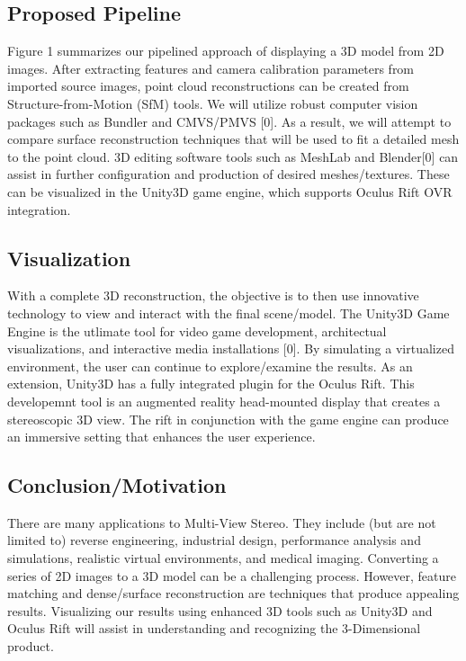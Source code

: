 \documentclass[10pt,twocolumn,letterpaper]{article}
\begin{document}
\subsection{Proposed Pipeline}
Figure 1 summarizes our pipelined approach of displaying a 3D model from 2D images.  After extracting features and camera calibration parameters from imported source images, point cloud reconstructions can be created from Structure-from-Motion (SfM) tools.  We will utilize robust computer vision packages such as Bundler and CMVS/PMVS [0].  As a result, we will attempt to compare surface reconstruction techniques that will be used to fit a detailed mesh to the point cloud.  3D editing software tools such as MeshLab and Blender[0] can assist in further configuration and production of desired meshes/textures.  These can be visualized in the Unity3D game engine, which supports Oculus Rift OVR integration.


\subsection{Visualization}
With a complete 3D reconstruction, the objective is to then use innovative technology to view and interact with the final scene/model. The Unity3D Game Engine is the utlimate tool for video game development, architectual visualizations, and interactive media installations [0].  By simulating a virtualized environment, the user can continue to explore/examine the results.  As an extension, Unity3D has a fully integrated plugin for the Oculus Rift.  This developemnt tool is an augmented reality head-mounted display that creates a stereoscopic 3D view.  The rift in conjunction with the game engine can produce an immersive setting that enhances the user experience.

\subsection{Conclusion/Motivation}
There are many applications to Multi-View Stereo.  They include (but are not limited to) reverse engineering, industrial design, performance analysis and simulations, realistic virtual environments, and medical imaging.  Converting a series of 2D images to a 3D model can be a challenging process.  However, feature matching and dense/surface reconstruction are techniques that produce appealing results.  Visualizing our results using enhanced 3D tools such as Unity3D and Oculus Rift will assist in understanding and recognizing the 3-Dimensional product.
\end{document}

